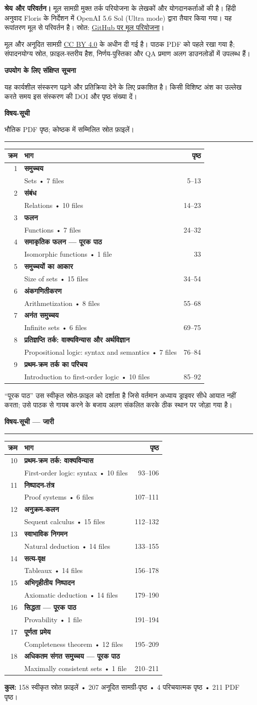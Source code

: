 \documentclass[11pt]{article}
\newcommand{\ruleline}{\textcolor{accent}{\rule{\linewidth}{1.4pt}}}
\newcommand{\module}[4]{%
  #1 & \textbf{#2}\\[-1pt]
  & {\small\foreignlanguage{english}{#3}} & #4\\[5pt]
}
\begin{document}
\textbf{श्रेय और परिवर्तन।} मूल सामग्री मुक्त तर्क परियोजना के लेखकों और
योगदानकर्ताओं की है। हिंदी अनुवाद Floris के निर्देशन में OpenAI 5.6 Sol
(Ultra mode) द्वारा तैयार किया गया। यह रूपांतरण मूल से परिवर्तन है। स्रोत:
\href{https://github.com/OpenLogicProject/OpenLogic}{GitHub पर मूल परियोजना}।

मूल और अनूदित सामग्री
\href{https://creativecommons.org/licenses/by/4.0/}{CC BY 4.0} के अधीन दी
गई है। पाठक PDF को पहले रखा गया है; संपादनयोग्य स्रोत, फ़ाइल-स्तरीय हैश,
निर्णय-पुस्तिका और QA प्रमाण अलग डाउनलोडों में उपलब्ध हैं।

\vfill
{\color{ink}\sffamily\bfseries\large उपयोग के लिए संक्षिप्त सूचना}\par
यह कार्यशील संस्करण पढ़ने और प्रतिक्रिया देने के लिए प्रकाशित है। किसी
विशिष्ट अंश का उल्लेख करते समय इस संस्करण की DOI और पृष्ठ संख्या दें।
\clearpage

{\color{ink}\sffamily\bfseries\LARGE विषय-सूची}\par
{\small भौतिक PDF पृष्ठ; कोष्ठक में सम्मिलित स्रोत फ़ाइलें।}\par
\ruleline
\vspace{3mm}
\renewcommand{\arraystretch}{1.05}
\begin{tabularx}{\linewidth}{@{}r X r@{}}
\textbf{क्रम} & \textbf{भाग} & \textbf{पृष्ठ}\\
\midrule
\module{1}{समुच्चय}{Sets • 7 files}{5–13}
\module{2}{संबंध}{Relations • 10 files}{14–23}
\module{3}{फलन}{Functions • 7 files}{24–32}
\module{4}{समाकृतिक फलन — पूरक पाठ}{Isomorphic functions • 1 file}{33}
\module{5}{समुच्चयों का आकार}{Size of sets • 15 files}{34–54}
\module{6}{अंकगणितीकरण}{Arithmetization • 8 files}{55–68}
\module{7}{अनंत समुच्चय}{Infinite sets • 6 files}{69–75}
\module{8}{प्रतिज्ञप्ति तर्क: वाक्यविन्यास और अर्थविज्ञान}{Propositional logic: syntax and semantics • 7 files}{76–84}
\module{9}{प्रथम-क्रम तर्क का परिचय}{Introduction to first-order logic • 10 files}{85–92}
\bottomrule
\end{tabularx}
\vfill
{\small “पूरक पाठ” उस स्वीकृत स्रोत-फ़ाइल को दर्शाता है जिसे वर्तमान अध्याय
ड्राइवर सीधे आयात नहीं करता; उसे पाठक से गायब करने के बजाय अलग संकलित करके
ठीक स्थान पर जोड़ा गया है।}
\clearpage

{\color{ink}\sffamily\bfseries\LARGE विषय-सूची — जारी}\par
\ruleline
\vspace{3mm}
\begin{tabularx}{\linewidth}{@{}r X r@{}}
\textbf{क्रम} & \textbf{भाग} & \textbf{पृष्ठ}\\
\midrule
\module{10}{प्रथम-क्रम तर्क: वाक्यविन्यास}{First-order logic: syntax • 10 files}{93–106}
\module{11}{निष्पादन-तंत्र}{Proof systems • 6 files}{107–111}
\module{12}{अनुक्रम-कलन}{Sequent calculus • 15 files}{112–132}
\module{13}{स्वाभाविक निगमन}{Natural deduction • 14 files}{133–155}
\module{14}{सत्य-वृक्ष}{Tableaux • 14 files}{156–178}
\module{15}{अभिगृहीतीय निष्पादन}{Axiomatic deduction • 14 files}{179–190}
\module{16}{सिद्धता — पूरक पाठ}{Provability • 1 file}{191–194}
\module{17}{पूर्णता प्रमेय}{Completeness theorem • 12 files}{195–209}
\module{18}{अधिकतम संगत समुच्चय — पूरक पाठ}{Maximally consistent sets • 1 file}{210–211}
\bottomrule
\end{tabularx}

\vfill
\begin{minipage}{\linewidth}
\colorbox{soft}{\parbox{0.94\linewidth}{\small
\textbf{कुल:} 158 स्वीकृत स्रोत फ़ाइलें • 207 अनूदित सामग्री-पृष्ठ •
4 परिचयात्मक पृष्ठ • 211 PDF पृष्ठ।}}
\end{minipage}
\end{document}
